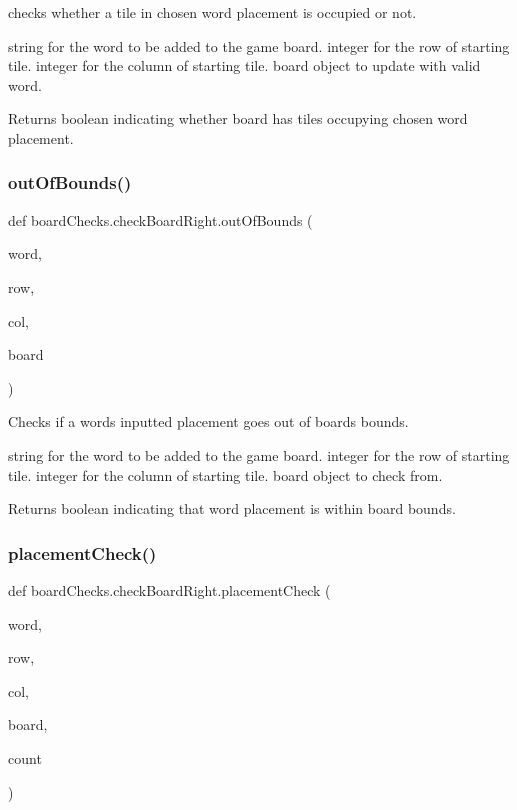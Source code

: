 checks whether a tile in chosen word placement is occupied or not. 

string for the word to be added to the game board.  integer for the row of starting tile.  integer for the column of starting tile.  board object to update with valid word. \begin{DoxyReturn}{Returns}
boolean indicating whether board has tiles occupying chosen word placement. 
\end{DoxyReturn}
\mbox{\label{classboard_checks_1_1check_board_right_a8bbad282fad43d8348073ff0a6a3748c}} 
\subsubsection{\texorpdfstring{out\+Of\+Bounds()}{outOfBounds()}}
{\footnotesize\ttfamily def board\+Checks.\+check\+Board\+Right.\+out\+Of\+Bounds (\begin{DoxyParamCaption}\item[{}]{word,  }\item[{}]{row,  }\item[{}]{col,  }\item[{}]{board }\end{DoxyParamCaption})}



Checks if a words inputted placement goes out of boards bounds. 

string for the word to be added to the game board.  integer for the row of starting tile.  integer for the column of starting tile.  board object to check from. \begin{DoxyReturn}{Returns}
boolean indicating that word placement is within board bounds. 
\end{DoxyReturn}
\mbox{\label{classboard_checks_1_1check_board_right_a19735f7a568095a393d40f08684e9d1f}} 
\subsubsection{\texorpdfstring{placement\+Check()}{placementCheck()}}
{\footnotesize\ttfamily def board\+Checks.\+check\+Board\+Right.\+placement\+Check (\begin{DoxyParamCaption}\item[{}]{word,  }\item[{}]{row,  }\item[{}]{col,  }\item[{}]{board,  }\item[{}]{count }\end{DoxyParamCaption})}




